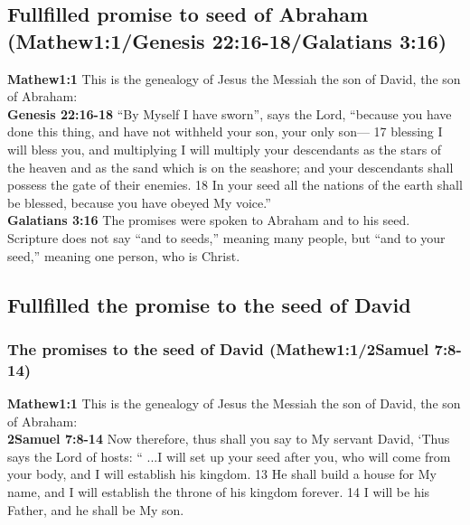 \subsection{Fullfilled promise to seed of Abraham (Mathew1:1/Genesis 22:16-18/Galatians 3:16)}
\textbf{Mathew1:1} This is the genealogy of Jesus the Messiah the son of David, the son of Abraham:\\
\textbf{Genesis 22:16-18} “By Myself I have sworn”, says the Lord, “because you have done this thing, and have not withheld your son, your only son— 17 blessing I will bless you, and multiplying I will multiply your descendants as the stars of the heaven and as the sand which is on the seashore; and your descendants shall possess the gate of their enemies. 18 In your seed all the nations of the earth shall be blessed, because you have obeyed My voice.”\\
\textbf{Galatians 3:16} The promises were spoken to Abraham and to his seed. Scripture does not say “and to seeds,” meaning many people, but “and to your seed,”  meaning one person, who is Christ.\\

\subsection{Fullfilled the promise to the seed of David}
\subsubsection{The promises to the seed of David (Mathew1:1/2Samuel 7:8-14)}
\textbf{Mathew1:1} This is the genealogy of Jesus the Messiah the son of David, the son of Abraham:\\
\textbf{2Samuel 7:8-14} Now therefore, thus shall you say to My servant David, ‘Thus says the Lord of hosts: “ ...I will set up your seed after you, who will come from your body, and I will establish his kingdom. 13 He shall build a house for My name, and I will establish the throne of his kingdom forever. 14 I will be his Father, and he shall be My son. 

